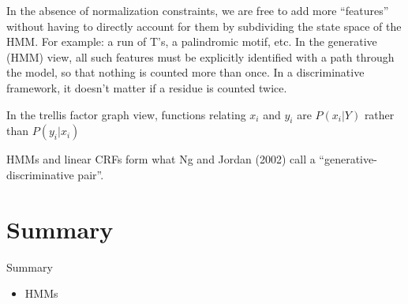 \documentclass{beamer}
\begin{document}
\begin{frame}
\itemb
\item In the absence of normalization constraints, we are free to add more ``features'' without having to directly account for them by subdividing the state space of the HMM.
For example: a run of T's, a palindromic motif, etc.
In the generative (HMM) view, all such features must be explicitly identified with a path through the model, so that nothing is counted more than once.
In a discriminative framework, it doesn't matter if a residue is counted twice.
\item In the trellis factor graph view, functions relating $x_i$ and $y_i$ are $P(x_i|Y)$ rather than $P(y_i|x_i)$
\item HMMs and linear CRFs form what Ng and Jordan (2002) call a ``generative-discriminative pair''.
\iteme

\end{frame}

\section*{Summary}

\begin{frame}{Summary}

  \begin{itemize}
  \item HMMs
  \end{itemize}

\end{frame}
\end{document}
